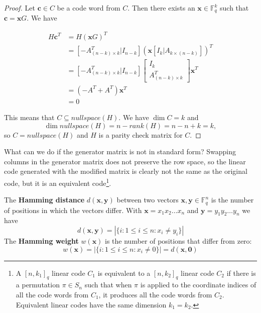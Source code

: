 \begin{proof}

Let $\bm{c} \in C$ be a code word from $C$. Then there exists an $\bm{x} \in \mathbb{F}_q^k$ such that $\bm{c} = \bm{x} G$.
We have

\begin{align*}
 H \bm{c}^T &= H (\bm{x} G)^T \\
        &= \left[ -A^T_{(n - k) \times k} | I_{n - k} \right] \left(\bm{x} \left[ I_k | A_{k \times (n - k)} \right]\right)^T \\
        &=  \left[ -A^T_{(n - k) \times k} | I_{n - k} \right] \left[ \begin{array}{c}
                                                                           I_k \\ \hline
                                                                           A^T_{(n - k) \times k}
                                                                       \end{array}  \right] \bm{x}^T \\
        &= (-A^T + A^T) \bm{x}^T \\
        &= 0
\end{align*}

This means that $C \subseteq nullspace(H)$. We have $\dim C = k$ and 
$$
\dim nullspace(H) = n - rank(H) = n - n + k = k,
$$
so $C = nullspace(H)$ and $H$ is a parity check matrix for $C$.

\end{proof}

What can we do if the generator matrix is not in standard form? Swapping columns in the generator matrix does not preserve the row space, so the linear code generated with the modified matrix is clearly not the same as the original code, but it is an equivalent code\footnote{A $[n, k_1]_q$ linear code $C_1$ is equivalent to a $[n, k_2]_q$ linear code $C_2$ if there is a permutation $\pi \in S_n$ such that when $\pi$ is applied to the coordinate indices of all the code words from $C_1$, it produces all the code words from $C_2$. Equivalent linear codes have the same dimension $k_1=k_2$.}. 

\begin{defn}\label{hammingDistDef}
The \textbf{Hamming distance} $d(\bm{x}, \bm{y})$ between two vectors $\bm{x}, \bm{y} \in \mathbb{F}_q^n$ is the number of positions in which the vectors differ. With $\bm{x} = x_1 x_2 \ldots x_n$ and $\bm{y} = y_1 y_2 \ldots y_n$ we have
$$
d(\bm{x}, \bm{y}) = |\{i : 1 \leq i \leq n : x_i \neq y_i\}|
$$
The \textbf{Hamming weight} $w(\bm{x})$ is the number of positions that differ from zero:
$$
w(\bm{x}) = |\{i : 1 \leq i \leq n : x_i \neq 0\}| = d(\bm{x}, \bm{0})
$$
\end{defn}

